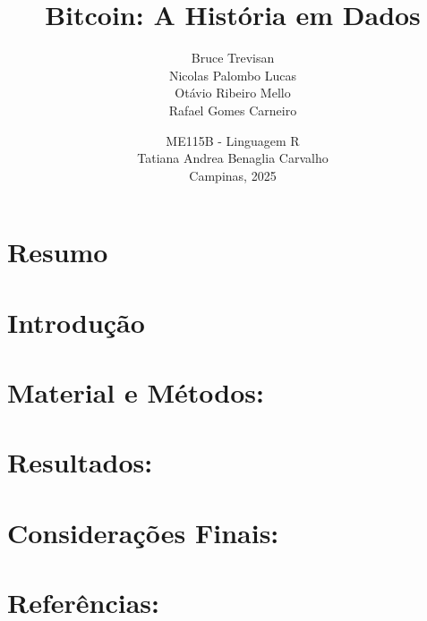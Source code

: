 \documentclass[12pt]{article}
\title{Bitcoin: A História em Dados}
\author{Bruce Trevisan \\ 
        Nicolas Palombo Lucas \\ 
        Otávio Ribeiro Mello \\ 
        Rafael Gomes Carneiro}
\date{ME115B - Linguagem R \\ 
        Tatiana Andrea Benaglia Carvalho \\ 
        Campinas, 2025}
\begin{document}




\newpage

\section{\textbf{Resumo}}



\newpage


\section{\textbf{Introdução}}



\newpage

\section{\textbf{Material e Métodos:}}






\newpage %


\section{\textbf{Resultados:}}



\newpage

\section{\textbf{Considerações Finais:}}



\newpage

\section{\textbf{Referências:}}


\end{document}
